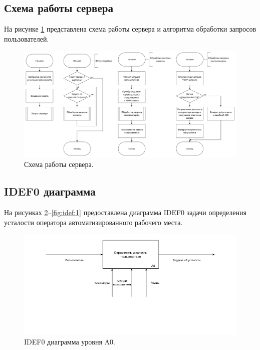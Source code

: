 \subsection{Схема работы сервера}

На рисунке \ref{fig:serverWork} представлена схема работы сервера и алгоритма обработки запросов пользователей.

\begin{figure}[H]
	\centering
	\includegraphics[width=\textwidth]{img/serverWorkScheme.pdf}
	\caption{Схема работы сервера.}
	\label{fig:serverWork}
\end{figure}

\subsection{IDEF0 диаграмма}
На рисунках \ref{fig:idef:0}--\ref{fig:idef:1} предоставлена диаграмма IDEF0 задачи определения усталости оператора автоматизированного рабочего места.

\begin{figure}[H]
	\centering
	\includegraphics[width=\textwidth]{img/A0.pdf}
	\caption{IDEF0 диаграмма уровня A0.}
	\label{fig:idef:0}
\end{figure}

